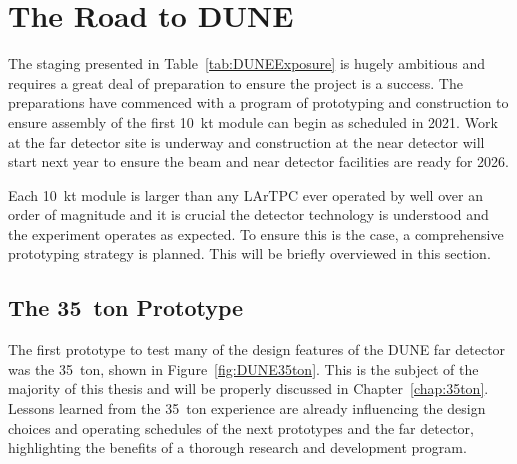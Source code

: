 \section{The Road to DUNE}\label{sec:RoadToDUNE}

The staging presented in Table~\ref{tab:DUNEExposure} is hugely ambitious and requires a great deal of preparation to ensure the project is a success.  The preparations have commenced with a program of prototyping and construction to ensure assembly of the first 10~kt module can begin as scheduled in 2021.  Work at the far detector site is underway and construction at the near detector will start next year to ensure the beam and near detector facilities are ready for 2026.

Each 10~kt module is larger than any LArTPC ever operated by well over an order of magnitude and it is crucial the detector technology is understood and the experiment operates as expected.  To ensure this is the case, a comprehensive prototyping strategy is planned.  This will be briefly overviewed in this section.

\subsection{The 35~ton Prototype}\label{sec:35ton}

The first prototype to test many of the design features of the DUNE far detector was the 35~ton, shown in Figure~\ref{fig:DUNE35ton}.  This is the subject of the majority of this thesis and will be properly discussed in Chapter~\ref{chap:35ton}.  Lessons learned from the 35~ton experience are already influencing the design choices and operating schedules of the next prototypes and the far detector, highlighting the benefits of a thorough research and development program.

